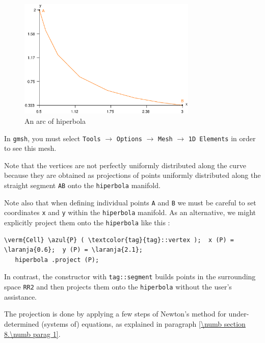 \begin{figure}[ht] \centering
  \includegraphics[width=85mm]{hiperbola}
  \caption{An arc of hiperbola}
  \label{\numb section 2.\numb fig 4}
\end{figure}

In {\tt gmsh}, you must select {\small\tt Tools} $\to$ {\small\tt Options} $\to$
{\small\tt Mesh} $\to$ {\small\tt 1D Elements} in order to see this mesh.

Note that the vertices are not perfectly uniformly distributed along the curve
because they are obtained as projections of points uniformly distributed along
the straight segment {\small\tt AB} onto the {\small\tt hiperbola} manifold.

Note also that when defining individual points {\small\tt A} and {\small\tt B} we must
be careful to set coordinates {\small\tt x} and {\small\tt y} within
the {\small\tt hiperbola} manifold.
As an alternative, we might explicitly project them onto the {\small\tt hiperbola} like this :

\begin{Verbatim}[commandchars=\\\{\},formatcom=\small\tt,baselinestretch=0.94]
   \verm{Cell} \azul{P} ( \textcolor{tag}{tag}::vertex );  x (P) = \laranja{0.6};  y (P) = \laranja{2.1};
   hiperbola .project (P);
\end{Verbatim}

\noindent In contrast, the {\small\tt{}} constructor with {\small\tt \textcolor{tag}{tag}::segment}
builds points in the surrounding space {\small\tt RR2} and then projects them onto the
{\small\tt hiperbola} without the user's assistance.

The projection is done by applying a few steps of Newton's method for under-determined
(systems of) equations, as explained in paragraph \ref{\numb section 8.\numb parag 1}.

